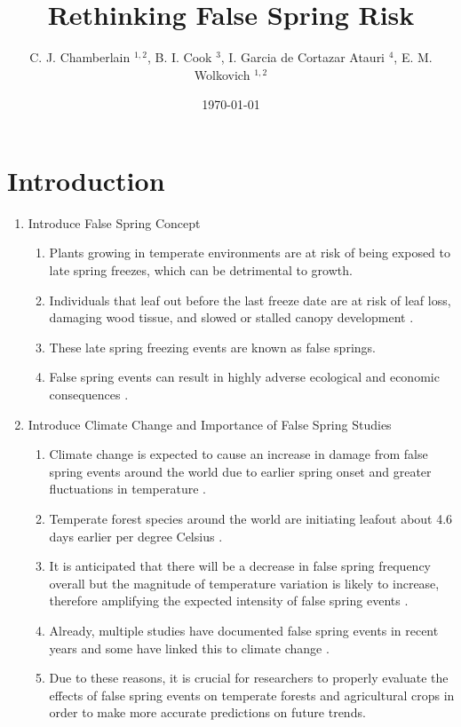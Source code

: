 \documentclass{article}\usepackage[]{graphicx}\usepackage[]{color}
\begin{document}
\title{Rethinking False Spring Risk}
\author{C. J. Chamberlain $^{1,2}$, B. I. Cook $^{3}$, I. Garcia de Cortazar Atauri $^{4}$, E. M. Wolkovich $^{1,2}$}
\date{\today}
\maketitle 
 

\renewcommand{\thetable}{\arabic{table}}
\renewcommand{\thefigure}{\arabic{figure}}
\renewcommand{\labelitemi}{$-$}

\section*{Introduction}
\begin{enumerate}
\item Introduce False Spring Concept
\begin {enumerate}
\item Plants growing in temperate environments are at risk of being exposed to late spring freezes, which can be detrimental to growth. 
\item Individuals that leaf out before the last freeze date are at risk of leaf loss, damaging wood tissue, and slowed or stalled canopy development \citep{Gu2008, Hufkens2012}. 
\item These late spring freezing events are known as false springs. 
\item False spring events can result in highly adverse ecological and economic consequences \citep{Knudson2012, Ault2013}.
\end{enumerate}

\item Introduce Climate Change and Importance of False Spring Studies
\begin{enumerate}
\item Climate change is expected to cause an increase in damage from false spring events around the world due to earlier spring onset and greater fluctuations in temperature \citep{Cannell1986, Inouye2008, Martin2010}. 
\item Temperate forest species around the world are initiating leafout about 4.6 days earlier per degree Celsius \citep{Wolkovich2012, Polgar2014}. 
\item It is anticipated that there will be a decrease in false spring frequency overall but the magnitude of temperature variation is likely to increase, therefore amplifying the expected intensity of false spring events \citep{Kodra2011, Allstadt2015}. 
\item Already, multiple studies have documented false spring events in recent years \citep{Gu2008, Augspurger2009, Knudson2012, Augspurger2013} and some have linked this to climate change \citep{Ault2013, Allstadt2015, Muffler2016, Xin2016}. 
\item Due to these reasons, it is crucial for researchers to properly evaluate the effects of false spring events on temperate forests and agricultural crops in order to make more accurate predictions on future trends.
\end{enumerate}


\end{enumerate}
\end{document}
